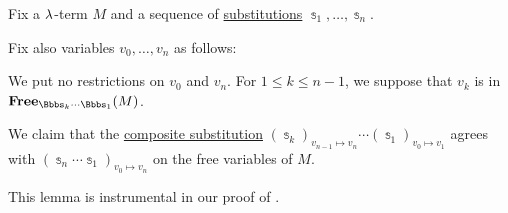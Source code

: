 \begin{lemma}\label{thm:composition_of_lambda_substitutions_lemma}
  Fix a \( {\mathrm \lambda} \)-term \( M \) and a sequence of \hyperref[def:lambda_term_substitution]{substitutions} \( \Bbbs_1, \ldots, \Bbbs_n \).

  Fix also variables \( v_0, \ldots, v_n \) as follows:
  \begin{thmenum}
     We put no restrictions on \( v_0 \) and \( v_n \).
     For \( 1 \leq k \leq n - 1 \), we suppose that \( v_k \) is  in \( \op*{Free}_{\Bbbs_k \cdots \Bbbs_1}(M) \).
  \end{thmenum}

  We claim that the \hyperref[def:lambda_substitution_composition]{composite substitution} \( (\Bbbs_k)_{v_{n-1} \mapsto v_n} \cdots (\Bbbs_1)_{v_0 \mapsto v_1} \) agrees with \( (\Bbbs_n \cdots \Bbbs_1)_{v_0 \mapsto v_n} \) on the free variables of \( M \).
\end{lemma}
\begin{comments}
  \item This lemma is instrumental in our proof of .
\end{comments}
